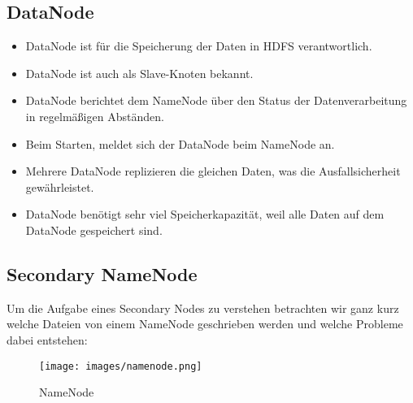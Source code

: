 \subsection{DataNode}
\begin{itemize}
\item DataNode ist für die Speicherung der Daten in HDFS verantwortlich.
\item DataNode ist auch als Slave-Knoten bekannt.
\item DataNode berichtet dem NameNode über den Status der Datenverarbeitung in regelmäßigen Abständen. 
\item Beim Starten, meldet sich der DataNode beim NameNode an.
\item Mehrere DataNode replizieren die gleichen Daten, was die Ausfallsicherheit gewährleistet.
\item DataNode benötigt sehr viel Speicherkapazität, weil alle Daten auf dem DataNode gespeichert sind.
\end{itemize}
\cite{nameNode}
\subsection{Secondary NameNode}
Um die Aufgabe eines Secondary Nodes zu verstehen betrachten wir ganz kurz welche Dateien von einem NameNode geschrieben werden und welche Probleme dabei entstehen:
\begin{figure}
	\centering
	\texttt{[image: images/namenode.png]}
	\caption{NameNode}
	\label{img:grafik-nameNode}
\end{figure}

